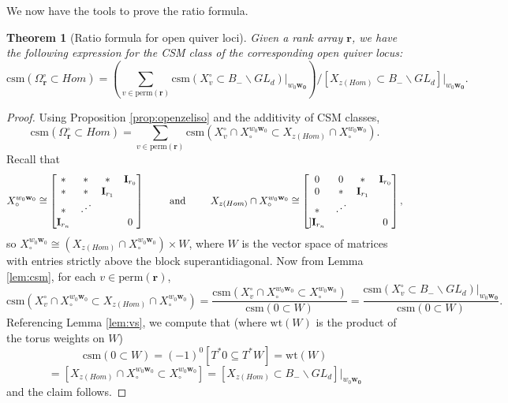 \documentclass[reqno]{amsart}
\newcommand{\csm}{\textrm{csm}}
\newcommand{\perm}{\textrm{perm}}
\numberwithin{equation}{section}
\newtheorem{theorem}{Theorem}[section]
\theoremstyle{definition}
\theoremstyle{remark}
\begin{document}
We now have the tools to prove the ratio formula.
\begin{theorem}[Ratio formula for open quiver loci]\label{thm:openratio}
Given a rank array $\mathbf{r}$, we have the following expression for the CSM class of the corresponding open quiver locus:
\[\csm(\Omega_{\mathbf{r}}^\circ \subset Hom) =
\left(\sum_{v \in \perm(\mathbf{r})}\csm(X_{v}^\circ \subset B_- \backslash GL_d)|_{w_0\mathbf{w_0}}\right) \Bigg/ [X_{z(Hom)}\subset B_- \backslash GL_d]|_{w_0\mathbf{w_0}}.\]
\end{theorem}
\begin{proof}
Using Proposition \ref{prop:openzeliso} and the additivity of CSM classes,
\[\csm(\Omega_{\mathbf{r}}^\circ \subset Hom)= \sum_{v \in \perm(\mathbf{r})} \csm(X_{v}^\circ \cap X_\circ^{w_0\mathbf{w}_0} \subset X_{z(Hom)} \cap X_\circ^{w_0\mathbf{w}_0}).\]
Recall that
\[
X_\circ^{w_0\mathbf{w}_0} \cong 
\begin{bmatrix} 
*&*&*&\mathbf{I}_{r_0}\\
*&*&\mathbf{I}_{r_1}&\\
*&\iddots&&\\
\mathbf{I}_{r_n}&&&0\\ \end{bmatrix}
\hspace{.75cm}\textrm{ and }\hspace{.75cm}
X_{z(Hom)} \cap X_\circ^{w_0\mathbf{w}_0} \cong \begin{bmatrix} 
0&0&*&\mathbf{I}_{r_0}\\
0&*&\mathbf{I}_{r_1}&\\
*&\iddots&&\\]
\mathbf{I}_{r_n}&&&0\\ \end{bmatrix}
,\]
so $X_\circ^{w_0\mathbf{w}_0} \cong (X_{z(Hom)}\cap X_\circ^{w_0\mathbf{w}_0}) \times W$, where $W$ is the vector space of matrices with entries strictly above the block superantidiagonal. Now from Lemma \ref{lem:csm}, for each $v \in \perm(\mathbf{r})$,
\[\csm(X_{v}^\circ \cap X_\circ^{w_0\mathbf{w}_0} \subset X_{z(Hom)} \cap X_\circ^{w_0\mathbf{w}_0}) = \frac{\csm(X_{v}^\circ \cap X_\circ^{w_0\mathbf{w}_0} \subset X_\circ^{w_0\mathbf{w}_0})}{\csm(0 \subset W)}=\frac{\csm(X_{v}^\circ \subset B_- \backslash GL_d)|_{w_0\mathbf{w_0}}}{\csm(0 \subset W)}.\]
Referencing Lemma \ref{lem:vs}, we compute that (where $\mathrm{wt}(W)$ is the product of the torus weights on $W$)
\[\csm(0 \subset W)=(-1)^{0}[T^*0 \subseteq T^*W] =\text{wt}(W)\]
\[=[X_{z(Hom)} \cap X_\circ^{w_0\mathbf{w}_0}\subset X_\circ^{w_0\mathbf{w}_0}]=[X_{z(Hom)}\subset B_- \backslash GL_d]|_{w_0\mathbf{w_0}}\]
and the claim follows.
\end{proof}
\end{document}

